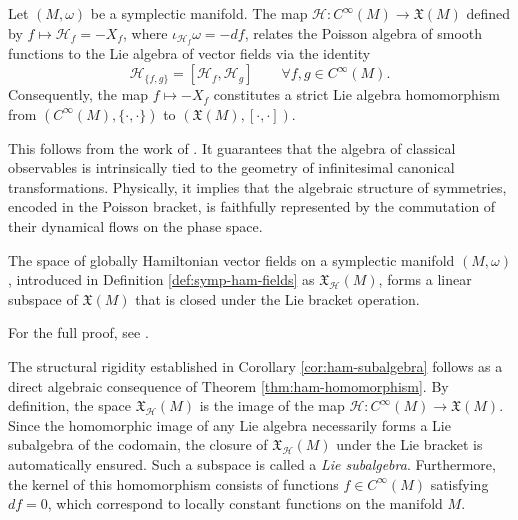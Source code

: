 \begin{theorem}\label{thm:ham-homomorphism}
	Let $(M, \omega)$ be a symplectic manifold. The map $\mathcal{H}: C^\infty(M) \to \mathfrak{X}(M)$ defined by $f \mapsto \mathcal{H}_f = -X_f$, where $\iota_{\mathcal{H}_f}\omega = -df$, relates the Poisson algebra of smooth functions to the Lie algebra of vector fields via the identity
	\[
	\mathcal{H}_{\{f, g\}} = [\mathcal{H}_f, \mathcal{H}_g] \qquad \forall f, g \in C^\infty(M).
	\]
	Consequently, the map $f \mapsto -X_f$ constitutes a strict Lie algebra homomorphism from $(C^\infty(M), \{\cdot, \cdot\})$ to $(\mathfrak{X}(M), [\cdot, \cdot])$.
\end{theorem}

This follows from the work of \cite[Corollary 3.3.18]{abrahamFoundationsMechanics2008}. It guarantees that the algebra of classical observables is intrinsically tied to the geometry of infinitesimal canonical transformations. Physically, it implies that the algebraic structure of symmetries, encoded in the Poisson bracket, is faithfully represented by the commutation of their dynamical flows on the phase space.

\begin{corollary}\label{cor:ham-subalgebra}
	The space of globally Hamiltonian vector fields on a symplectic manifold $(M, \omega)$, introduced in Definition \ref{def:symp-ham-fields} as $\mathfrak{X}_{\mathcal{H}}(M)$, forms a linear subspace of $\mathfrak{X}(M)$ that is closed under the Lie bracket operation.
\end{corollary}

\noindent For the full proof, see \cite[Corollary 3.3.18]{abrahamFoundationsMechanics2008}.

\begin{remark}\label{rem:ham-subalgebra-proof}
	The structural rigidity established in Corollary \ref{cor:ham-subalgebra} follows as a direct algebraic consequence of Theorem \ref{thm:ham-homomorphism}. By definition, the space $\mathfrak{X}_{\mathcal{H}}(M)$ is the image of the map $\mathcal{H}: C^\infty(M) \to \mathfrak{X}(M)$. Since the homomorphic image of any Lie algebra necessarily forms a Lie subalgebra of the codomain, the closure of $\mathfrak{X}_{\mathcal{H}}(M)$ under the Lie bracket is automatically ensured. Such a subspace is called a \emph{Lie subalgebra}. Furthermore, the kernel of this homomorphism consists of functions $f \in C^\infty(M)$ satisfying $df = 0$, which correspond to locally constant functions on the manifold $M$. 
\end{remark}

